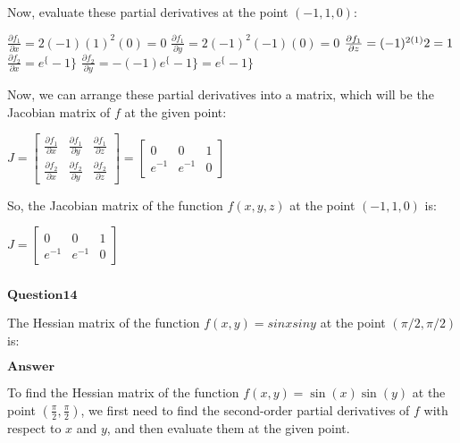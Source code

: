 \documentclass[11pt]{article}
\makeatletter
\newcommand{\boxspacing}{\kern\kvtcb@left@rule\kern\kvtcb@boxsep}
\newcommand{\prompt}[4]{
        {\ttfamily\llap{{\color{#2}[#3]:\hspace{3pt}#4}}\vspace{-\baselineskip}}
    }
\makeatother
\begin{document}
Now, evaluate these partial derivatives at the point $ (-1, 1, 0) $:

$ \frac{\partial f_1}{\partial x} = 2(-1)(1)^2(0) = 0 $ $
\frac{\partial f_1}{\partial y} = 2(-1)^2(-1)(0) = 0 $ $
\frac{\partial f_1}{\partial z} = (-1)\textsuperscript{2(1)}2 = 1 $ $
\frac{\partial f_2}{\partial x} = e^\{-1\} $ $
\frac{\partial f_2}{\partial y} = -(-1)e^\{-1\} = e^\{-1\} $

Now, we can arrange these partial derivatives into a matrix, which will
be the Jacobian matrix of $ f $ at the given point:

$ J =\begin{bmatrix} \frac{\partial f_1}{\partial x} & \frac{\partial f_1}{\partial y} & \frac{\partial f_1}{\partial z} \\ \frac{\partial f_2}{\partial x} & \frac{\partial f_2}{\partial y} & \frac{\partial f_2}{\partial z} \end{bmatrix}=\begin{bmatrix} 0 & 0 & 1 \\ e^{-1} & e^{-1} & 0 \end{bmatrix}$

So, the Jacobian matrix of the function $ f(x, y, z) $ at the point $
(-1, 1, 0) $ is:

$ J =\begin{bmatrix} 0 & 0 & 1 \\ e^{-1} & e^{-1} & 0 \end{bmatrix}$

    \begin{tcolorbox}[breakable, size=fbox, boxrule=1pt, pad at break*=1mm,colback=cellbackground, colframe=cellborder]
\prompt{In}{incolor}{ }{\boxspacing}
\begin{Verbatim}[commandchars=\\\{\}]

\end{Verbatim}
\end{tcolorbox}

    $\textbf{Question14}$

The Hessian matrix of the function $f(x,y)=sinx siny$ at the point
$(π/2,π/2)$ is:

$\textbf{Answer}$

    To find the Hessian matrix of the function $ f(x, y) = \sin(x) \sin(y)
$ at the point $ \left(\frac{\pi}{2}, \frac{\pi}{2}\right) $, we
first need to find the second-order partial derivatives of $ f $ with
respect to $ x $ and $ y $, and then evaluate them at the given
point.
\end{document}
